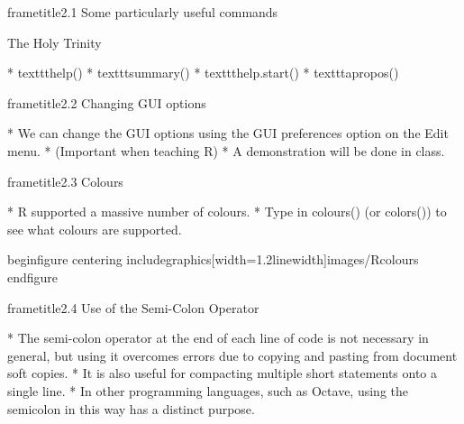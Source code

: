  	
 	
 	
 		frametitle{2.1 Some particularly useful commands}
 		
 		
 		The Holy Trinity
 		
 			         * texttt{help()}
 			         * texttt{summary()}
 			         * texttt{help.start()}
 			         * texttt{apropos()}
 		
 		
 	
 	
 		frametitle{2.2 Changing GUI options}
 		
 			         * We can change the GUI options using the GUI preferences option on the Edit menu.
 			          * (Important
 			when teaching R) 
 			         * A demonstration will be done in class.
 		
 		
 	
 	
 		frametitle{2.3 Colours}
 		
 			         * R supported a massive number of colours.
 			         * Type in colours() (or colors()) to see what colours
 			are supported.
 		
 	
 	
 	
 		begin{figure}
 			centering
 			includegraphics[width=1.2linewidth]{images/Rcolours}
 		end{figure}
 		
 	
 	
 	
 		frametitle{2.4 Use of the Semi-Colon Operator}
 		
 			         * The semi-colon operator at the end of each line of code is not necessary in general, but using it
 			overcomes errors due to copying and pasting from document soft copies. 
 			         * It is also useful for compacting multiple short statements onto a single line.
 			         * In other programming
 			languages, such as Octave, using the semicolon in this way has a distinct purpose.
 		
 	
 	
